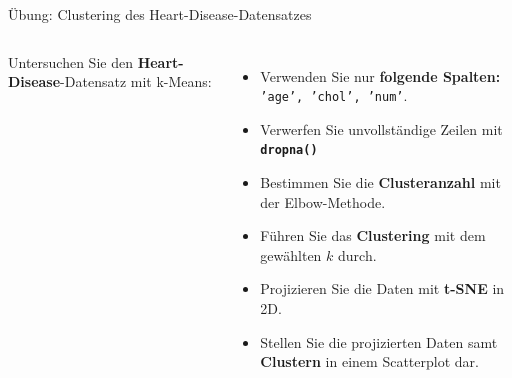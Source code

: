 \begin{frame}{Übung: Clustering des Heart-Disease-Datensatzes}
\footnotesize
\begin{columns}  
Untersuchen Sie den \textbf{Heart-Disease}-Datensatz mit k-Means:

\begin{itemize}
  \item Verwenden Sie nur \textbf{folgende Spalten: } \texttt{'age', 'chol', 'num'}.
  \item Verwerfen Sie unvollständige Zeilen mit \texttt{\bfseries dropna() }
  \item Bestimmen Sie die \textbf{Clusteranzahl} mit der Elbow-Methode.
  \item Führen Sie das \textbf{Clustering} mit dem gewählten $k$ durch.
  \item Projizieren Sie die Daten mit \textbf{t-SNE} in 2D.
  \item Stellen Sie die projizierten Daten samt \textbf{Clustern} in einem
        Scatterplot dar.
\end{itemize}

\centering
{}
\end{columns}


\end{frame}

\makequestionspage{\FRAGENIMAGE}